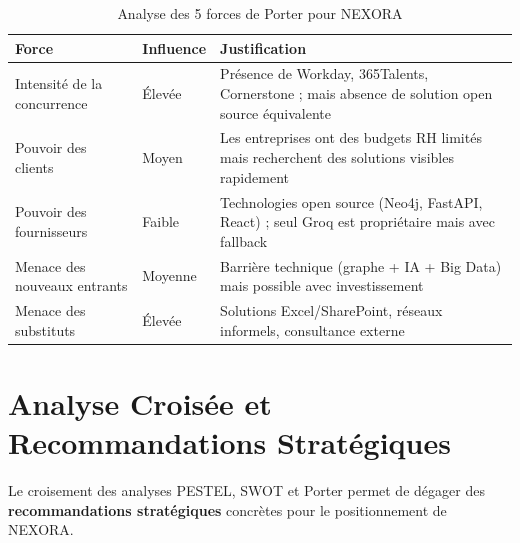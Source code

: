 \documentclass[12pt,a4paper]{report}
\begin{document}
\begin{table}[H]
\centering
\caption{Analyse des 5 forces de Porter pour NEXORA}
\label{tab:porter}
\begin{tabular}{p{5.5cm} p{2.5cm} p{6.5cm}}
\toprule
\textbf{Force} & \textbf{Influence} & \textbf{Justification} \\
\midrule
Intensité de la concurrence & Élevée & Présence de Workday, 365Talents, Cornerstone ; mais absence de solution open source équivalente \\
Pouvoir des clients & Moyen & Les entreprises ont des budgets RH limités mais recherchent des solutions visibles rapidement \\
Pouvoir des fournisseurs & Faible & Technologies open source (Neo4j, FastAPI, React) ; seul Groq est propriétaire mais avec fallback \\
Menace des nouveaux entrants & Moyenne & Barrière technique (graphe + IA + Big Data) mais possible avec investissement \\
Menace des substituts & Élevée & Solutions Excel/SharePoint, réseaux informels, consultance externe \\
\bottomrule
\end{tabular}
\end{table}


\section{Analyse Croisée et Recommandations Stratégiques}
Le croisement des analyses PESTEL, SWOT et Porter permet de dégager des \textbf{recommandations stratégiques} concrètes pour le positionnement de NEXORA.

\begin{table}[H]
\centering
\caption{Matrice de recommandations stratégiques (croisement SWOT--PESTEL)}
\label{tab:cross_analysis}

\end{table}
\end{document}
